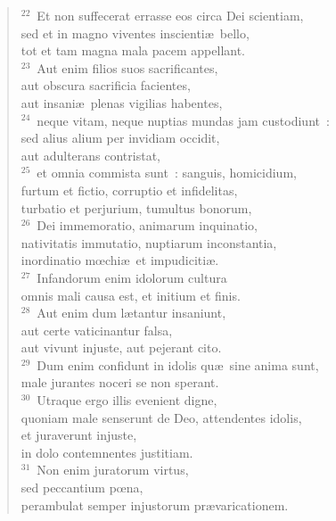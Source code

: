 \begin{flushleft}\begin{verse}${}^{22}$~Et non suffecerat errasse eos circa Dei scientiam,\\ sed et in magno viventes inscienti\ae\ bello,\\ tot et tam magna mala pacem appellant.\\
${}^{23}$~Aut enim filios suos sacrificantes,\\ aut obscura sacrificia facientes,\\ aut insani\ae\ plenas vigilias habentes,\\
${}^{24}$~neque vitam, neque nuptias mundas jam custodiunt~:\\ sed alius alium per invidiam occidit,\\ aut adulterans contristat,\\
${}^{25}$~et omnia commista sunt~: sanguis, homicidium,\\ furtum et fictio, corruptio et infidelitas,\\ turbatio et perjurium, tumultus bonorum,\\
${}^{26}$~Dei immemoratio, animarum inquinatio,\\ nativitatis immutatio, nuptiarum inconstantia,\\ inordinatio mœchi\ae\ et impudiciti\ae .\\
${}^{27}$~Infandorum enim idolorum cultura\\ omnis mali causa est, et initium et finis.\\
${}^{28}$~Aut enim dum l\ae tantur insaniunt,\\ aut certe vaticinantur falsa,\\ aut vivunt injuste, aut pejerant cito.\\
${}^{29}$~Dum enim confidunt in idolis qu\ae\ sine anima sunt,\\ male jurantes noceri se non sperant.\\
${}^{30}$~Utraque ergo illis evenient digne,\\ quoniam male senserunt de Deo, attendentes idolis,\\ et juraverunt injuste,\\ in dolo contemnentes justitiam.\\
${}^{31}$~Non enim juratorum virtus,\\ sed peccantium pœna,\\ perambulat semper injustorum pr\ae varicationem.\end{verse}\end{flushleft}


